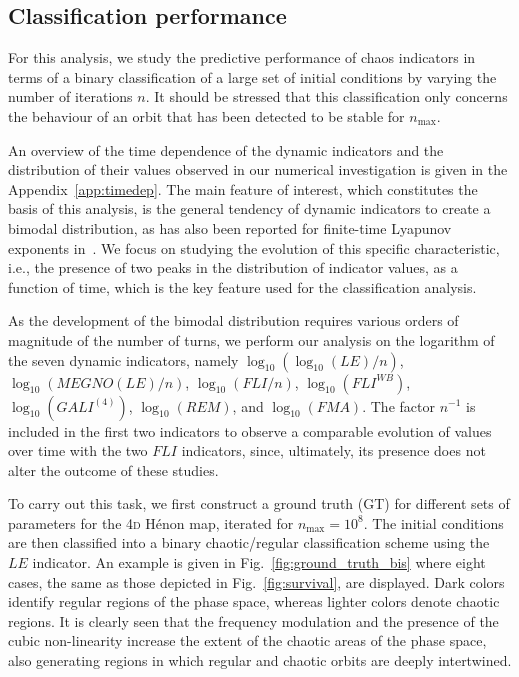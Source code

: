 \subsection{Classification performance}\label{subsec:dyn:classification}

For this analysis, we study the predictive performance of chaos indicators in terms of a binary classification of a large set of initial conditions by varying the number of iterations $n$. It should be stressed that this classification only concerns the behaviour of an orbit that has been detected to be stable for $n_\mathrm{max}$.

An overview of the time dependence of the dynamic indicators and the distribution of their values observed in our numerical investigation is given in the Appendix~\ref{app:timedep}. The main feature of interest, which constitutes the basis of this analysis, is the general tendency of dynamic indicators to create a bimodal distribution, as has also been reported for finite-time Lyapunov exponents in~\cite{PhysRevE.60.2761,VALLEJO200326}. We focus on studying the evolution of this specific characteristic, i.e., the presence of two peaks in the distribution of indicator values, as a function of time, which is the key feature used for the classification analysis.

As the development of the bimodal distribution requires various orders of magnitude of the number of turns, we perform our analysis on the logarithm of the seven dynamic indicators, namely $\log_{10}(\log_{10}(LE)/n)$, $\log_{10}(MEGNO(LE)/n)$, $\log_{10}(FLI/n)$, $\log_{10}(FLI^{WB})$, $\log_{10}(GALI^{(4)})$, $\log_{10}(REM)$, and $\log_{10}(FMA)$. The factor $n^{-1}$ is included in the first two indicators to observe a comparable evolution of values over time with the two $FLI$ indicators, since, ultimately, its presence does not alter the outcome of these studies.

To carry out this task, we first construct a ground truth (GT) for different sets of parameters for the 4\textsc{d} Hénon map, iterated for $n_\text{max} = 10^8$. The initial conditions are then classified into a binary chaotic/regular classification scheme using the $LE$ indicator. An example is given in Fig.~\ref{fig:ground_truth_bis} where eight cases, the same as those depicted in Fig.~\ref{fig:survival}, are displayed. Dark colors identify regular regions of the phase space, whereas lighter colors denote chaotic regions. It is clearly seen that the frequency modulation and the presence of the cubic non-linearity increase the extent of the chaotic areas of the phase space, also generating regions in which regular and chaotic orbits are deeply intertwined.  

